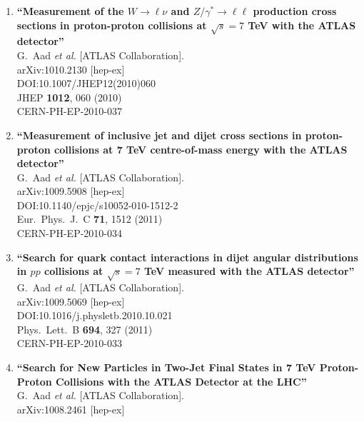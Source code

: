 \documentclass{article}
\begin{document}
\begin{enumerate}
\item%
{\bf ``Measurement of the $W \to \ell\nu$ and $Z/\gamma^* \to \ell\ell$ production cross sections in proton-proton collisions at $\sqrt{s} = 7$ TeV with the ATLAS detector''}
  \\{}G.~Aad {\it et al.} [ATLAS Collaboration].
  \\{}arXiv:1010.2130 [hep-ex]
  \\{}DOI:10.1007/JHEP12(2010)060
  \\{}JHEP {\bf 1012}, 060 (2010)
  \\{}CERN-PH-EP-2010-037
\item%
{\bf ``Measurement of inclusive jet and dijet cross sections in proton-proton collisions at 7 TeV centre-of-mass energy with the ATLAS detector''}
  \\{}G.~Aad {\it et al.} [ATLAS Collaboration].
  \\{}arXiv:1009.5908 [hep-ex]
  \\{}DOI:10.1140/epjc/s10052-010-1512-2
  \\{}Eur.\ Phys.\ J.\ C {\bf 71}, 1512 (2011)
  \\{}CERN-PH-EP-2010-034
\item%
{\bf ``Search for quark contact interactions in dijet angular distributions in $pp$ collisions at $\sqrt{s}=7$ TeV measured with the ATLAS detector''}
  \\{}G.~Aad {\it et al.} [ATLAS Collaboration].
  \\{}arXiv:1009.5069 [hep-ex]
  \\{}DOI:10.1016/j.physletb.2010.10.021
  \\{}Phys.\ Lett.\ B {\bf 694}, 327 (2011)
  \\{}CERN-PH-EP-2010-033
\item%
{\bf ``Search for New Particles in Two-Jet Final States in 7 TeV Proton-Proton Collisions with the ATLAS Detector at the LHC''}
  \\{}G.~Aad {\it et al.} [ATLAS Collaboration].
  \\{}arXiv:1008.2461 [hep-ex]

\end{enumerate}
\end{document}
